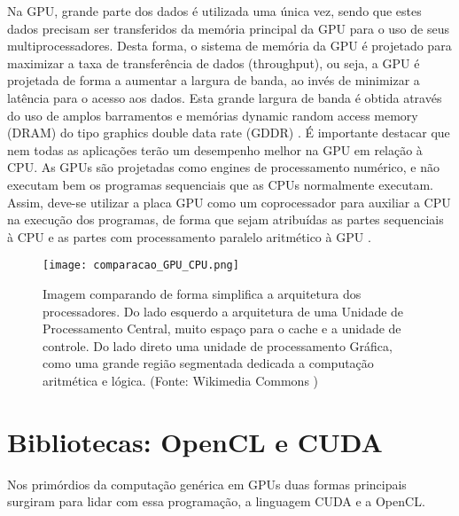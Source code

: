   Na GPU, grande parte dos dados é utilizada uma única vez, sendo que estes dados precisam ser transferidos da memória principal da GPU para o uso de seus multiprocessadores. Desta forma, o sistema de memória da GPU é projetado para maximizar a taxa de transferência de dados (throughput), ou seja, a GPU é projetada de forma a aumentar a largura de banda, ao invés de minimizar a latência para o acesso aos dados. Esta grande largura de banda é obtida através do uso de amplos barramentos e memórias dynamic random access memory (DRAM) do tipo graphics double data rate (GDDR) \citep{closer-look:08}. É importante destacar que nem todas as aplicações terão um desempenho melhor na GPU em relação à CPU. As GPUs são projetadas como engines de processamento numérico, e não executam bem os programas sequenciais que as CPUs normalmente executam. Assim, deve-se utilizar a placa GPU como um coprocessador para auxiliar a CPU na execução dos programas, de forma que sejam atribuídas as partes sequenciais à CPU e as partes com processamento paralelo aritmético à GPU \citep{massively:16}.

  \begin{figure}[!h]
    \centering
    \texttt{[image: comparacao\_GPU\_CPU.png]}
    \caption{Imagem comparando de forma simplifica a arquitetura dos processadores. Do lado esquerdo a arquitetura de uma Unidade de Processamento Central, muito espaço para o cache e a unidade de controle. Do lado direto uma unidade de processamento Gráfica, como uma grande região segmentada dedicada a computação aritmética e lógica. (Fonte: Wikimedia Commons \protect\footnotemark)}
    \label{fig:cpuvsgpu}
  \end{figure}


\section{Bibliotecas: OpenCL e CUDA}

  Nos primórdios da computação genérica em GPUs duas formas principais surgiram para lidar com essa programação, a linguagem CUDA e a OpenCL.

